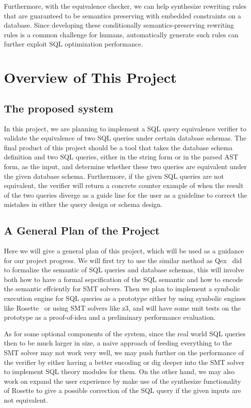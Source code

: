 \documentclass{article}
\begin{document}
Furthermore, with the equivalence checker, we can help synthesize rewriting rules that are guaranteed to be semantics preserving with embedded constraints on a database. Since developing these conditionally semantics-preserving rewriting rules is a common challenge for humans, automatically generate such rules can further exploit SQL optimization performance.

\section{Overview of This Project}
\subsection{The proposed system}
In this project, we are planning to implement a SQL query equivalence verifier
to validate the equivalence of two SQL queries under certain database schemas.
The final product of this project should be a tool that takes the database schema
definition and two SQL queries, either in the string form or in the parsed AST form, 
as the input, and determine whether these two queries are equivalent under the given
database schema. 
Furthermore, if the given SQL queries are not equivalent, the verifier will return a concrete
counter example of when the result of the two queries diverge as a guide line for the user
as a guideline to correct the mistakes in either the query design or schema design.

\subsection{A General Plan of the Project}
Here we will give a general plan of this project, which will be used as a guidance for our
project progress.
We will first try to use the similar method as Qex~\cite{veanes2010qex,veanes2009symbolic} did
to formalize the semantic of SQL queries and database schemas, this will involve both how to 
have a formal sepcification of the SQL semantic and how to encode the semantic effciently for
SMT solvers.
Then we plan to implement a symbolic execution engine for SQL queries as a prototype 
either by using symbolic engines like Rosette~\cite{torlak2014lightweight} 
or using SMT solvers like z3, and will have some unit tests on the prototype as
a proof-of-idea and a preliminary performance evaluation.

As for some optional components of the system, 
since the real world SQL queries then to be much larger in size, a naive approach of feeding everything
to the SMT solver may not work very well,
we may push further on the performance of the verifier by either having a better encoding or dig deeper
into the SMT solver to implement SQL theory modules for them.
On the other hand, we may also work on expand the user experience by make use of the synthesize functionality
of Rosette to give a possible correction of the SQL query if the given inputs are not equivalent.
\end{document}
